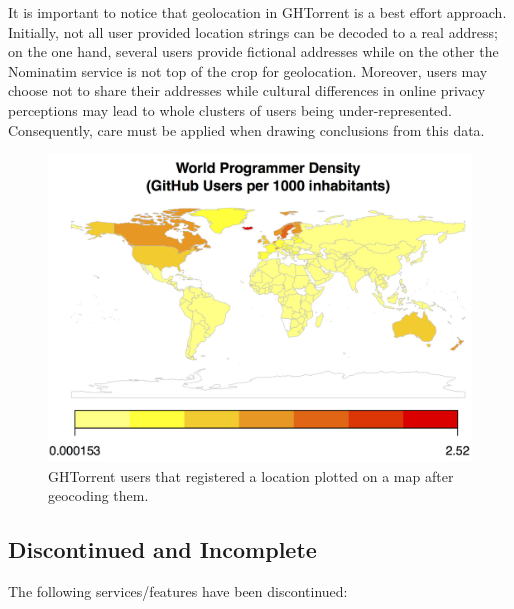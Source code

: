 \documentclass{sig-alternate}
\begin{document}
It is important to notice that geolocation in GHTorrent is a best effort
approach. Initially, not all user provided location strings can be decoded to a
real address; on the one hand, several users provide fictional addresses while
on the other the Nominatim service is not top of the crop for geolocation.
Moreover, users may choose not to share their addresses while cultural
differences in online privacy perceptions may lead to whole clusters of users
being under-represented. Consequently, care must be applied when drawing
conclusions from this data.

\begin{figure}
  \begin{center}
    \includegraphics[scale=0.2]{dev-map.png}
  \end{center}
  \caption{GHTorrent users that registered a location plotted on a map after
  geocoding them.}
  \label{fig:dev-map}
\end{figure}

\subsection{Discontinued and Incomplete}

The following services/features have been discontinued:
\end{document}
